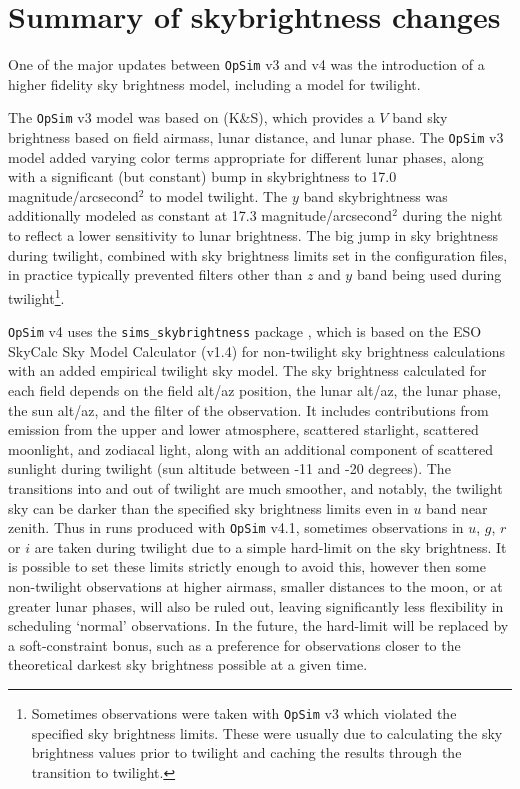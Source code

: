\documentclass[DM,lsstdraft,authoryear,toc]{lsstdoc}
\newcommand{\opsim}{\texttt{OpSim}\xspace}
\newcommand{\simsky}{\texttt{sims\_skybrightness}\xspace}
\newcommand{\magasq}{magnitude/arcsecond$^{2}$\xspace}
\begin{document}
\section{Summary of skybrightness changes}

One of the major updates between \opsim v3 and v4 was the introduction of a higher fidelity sky brightness model, including a model for twilight.

The \opsim v3 model was based on \citet{1991PASP..103.1033K} (K\&S), which provides a $V$ band sky brightness based on field airmass, lunar distance, and lunar phase. The \opsim v3 model added varying color terms appropriate for different lunar phases, along with a significant (but constant) bump in skybrightness to 17.0 \magasq to model twilight. The $y$ band skybrightness was additionally modeled as constant at 17.3 \magasq during the night to reflect a lower sensitivity to lunar brightness.  The big jump in sky brightness during twilight, combined with sky brightness limits set in the configuration files, in practice typically prevented filters other than $z$ and $y$ band being used during twilight\footnote{Sometimes observations were taken with \opsim v3 which violated the specified sky brightness limits. These were usually due to calculating the sky brightness values prior to twilight and caching the results through the transition to twilight.}.

\opsim v4 uses the \simsky package \citep{2016SPIE.9910E..1AY}, which is based on the ESO SkyCalc Sky Model Calculator  (v1.4) for non-twilight sky brightness calculations with an added empirical twilight sky model. The sky brightness calculated for each field depends on the field alt/az position, the lunar alt/az, the lunar phase, the sun alt/az, and the filter of the observation. It includes contributions from emission from the upper and lower atmosphere, scattered starlight, scattered moonlight, and zodiacal light, along with an additional component of scattered sunlight during twilight (sun altitude between -11 and -20 degrees). The transitions into and out of twilight are much smoother, and notably, the twilight sky can be darker than the specified sky brightness limits even in $u$ band near zenith. Thus in runs produced with \opsim v4.1, sometimes observations in $u$, $g$, $r$ or $i$ are taken during twilight due to a simple hard-limit on the sky brightness. It is possible to set these limits strictly enough to avoid this, however then some non-twilight observations at higher airmass, smaller distances to the moon, or at greater lunar phases, will also be ruled out, leaving significantly less flexibility in scheduling `normal' observations. In the future, the hard-limit will be replaced by a soft-constraint bonus, such as a preference for observations closer to the theoretical darkest sky brightness possible at a given time.
\end{document}
